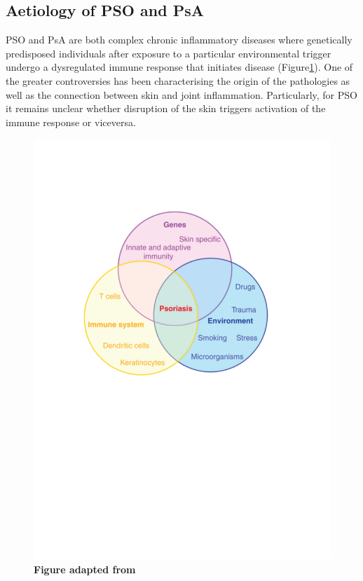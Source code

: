 \subsection{Aetiology of PSO and PsA}

PSO and PsA are both complex chronic inflammatory diseases where genetically predisposed individuals after exposure to a particular environmental trigger undergo a dysregulated immune response that initiates disease (Figure\ref{fig:PSO_aetiology_diagram}). One of the greater controversies has been characterising the origin of the pathologies as well as the connection between skin and joint inflammation. Particularly, for PSO it remains unclear whether disruption of the skin triggers activation of the immune response or viceversa.

\begin{figure}[H]
\includegraphics[width=\textwidth]{./Introduction/pdfs/PSO_aetiology_diagram_Di_Meglio_et_al_2014.pdf}
\caption[Main factors involved in PSO disease aetiology]{\textbf{Figure adapted from \parencite{Meglio2014}}}
\label{fig:PSO_aetiology_diagram}
\end{figure}


